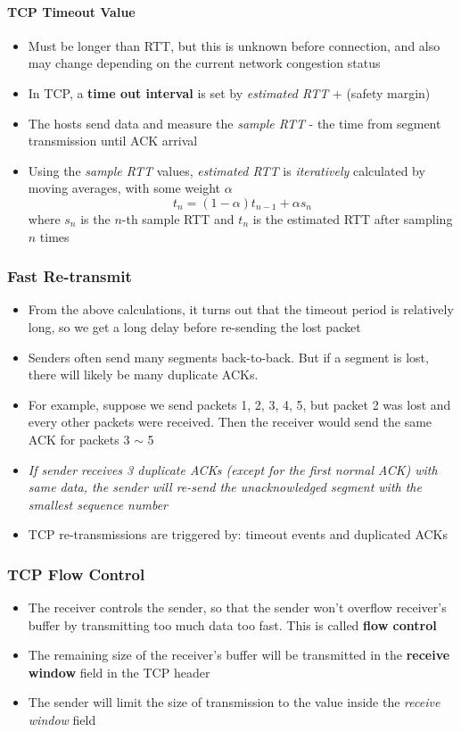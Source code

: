 \paragraph{TCP Timeout Value}
\begin{itemize}
	\item Must be longer than RTT, but this is unknown before connection, and also may change depending on the current network congestion status
	\item In TCP, a \textbf{time out interval} is set by  \textit{estimated RTT} + (safety margin)
	\item The hosts send data and measure the \textit{sample RTT} - the time from segment transmission until ACK arrival
	\item Using the \textit{sample RTT} values, \textit{estimated RTT} is \textit{iteratively} calculated by moving averages, with some weight $\alpha$
	$$t_{n} = (1-\alpha) t_{n-1} + \alpha s_n $$
	where $s_n$ is the $n$-th sample RTT and $t_n$ is the estimated RTT after sampling $n$ times
\end{itemize}

\subsubsection{Fast Re-transmit}
\begin{itemize}
	\item From the above calculations, it turns out that the timeout period is relatively long, so we get a long delay before re-sending the lost packet
	\item Senders often send many segments back-to-back. But if a segment is lost, there will likely be many duplicate ACKs.
	\item For example, suppose we send packets 1, 2, 3, 4, 5, but packet 2 was lost and every other packets were received. Then the receiver would send the same ACK for packets 3 $\sim$ 5
	\item \textit{If sender receives 3 duplicate ACKs (except for the first normal ACK) with same data, the sender will re-send the unacknowledged segment with the smallest sequence number}
	\item TCP re-transmissions are triggered by: timeout events and duplicated ACKs 
\end{itemize}

\subsubsection{TCP Flow Control}
\begin{itemize}
	\item The receiver controls the sender, so that the sender won't overflow receiver's buffer by transmitting too much data too fast. This is called \textbf{flow control}
	\item The remaining size of the receiver's buffer will be transmitted in the \textbf{receive window} field in the TCP header
	\item The sender will limit the size of transmission to the value inside the \textit{receive window} field
\end{itemize}

